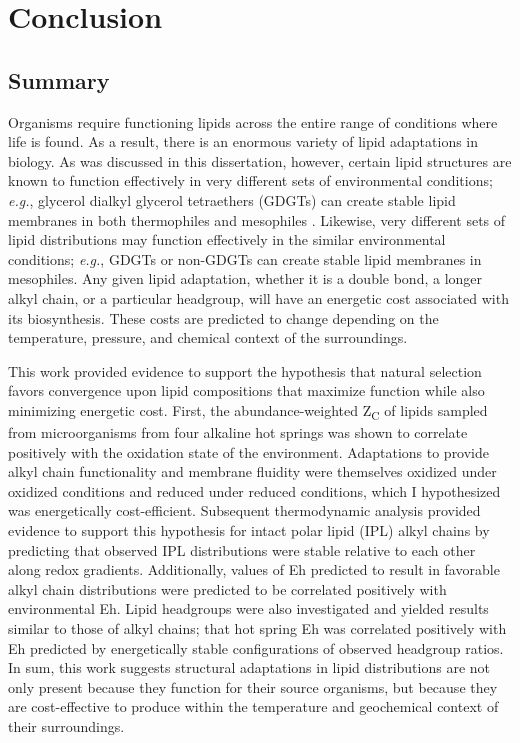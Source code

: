 \chapter[CONCLUSION]{Conclusion}

\section{Summary}

Organisms require functioning lipids across the entire range of conditions where life is found. As a result, there is an enormous variety of lipid adaptations in biology. As was discussed in this dissertation, however, certain lipid structures are known to function effectively in very different sets of environmental conditions; \textit{e.g.}, glycerol dialkyl glycerol tetraethers (GDGTs) can create stable lipid membranes in both thermophiles and mesophiles \citep{schouten2000widespread}. Likewise, very different sets of lipid distributions may function effectively in the similar environmental conditions; \textit{e.g.}, GDGTs or non-GDGTs can create stable lipid membranes in mesophiles. Any given lipid adaptation, whether it is a double bond, a longer alkyl chain, or a particular headgroup, will have an energetic cost associated with its biosynthesis. These costs are predicted to change depending on the temperature, pressure, and chemical context of the surroundings.

This work provided evidence to support the hypothesis that natural selection favors convergence upon lipid compositions that maximize function while also minimizing energetic cost. First, the abundance-weighted Z\textsubscript{C} of lipids sampled from microorganisms from four alkaline hot springs was shown to correlate positively with the oxidation state of the environment. Adaptations to provide alkyl chain functionality and membrane fluidity were themselves oxidized under oxidized conditions and reduced under reduced conditions, which I hypothesized was energetically cost-efficient. Subsequent thermodynamic analysis provided evidence to support this hypothesis for intact polar lipid (IPL) alkyl chains by predicting that observed IPL distributions were stable relative to each other along redox gradients. Additionally, values of Eh predicted to result in favorable alkyl chain distributions were predicted to be correlated positively with environmental Eh. Lipid headgroups were also investigated and yielded results similar to those of alkyl chains; that hot spring Eh was correlated positively with Eh predicted by energetically stable configurations of observed headgroup ratios. In sum, this work suggests structural adaptations in lipid distributions are not only present because they function for their source organisms, but because they are cost-effective to produce within the temperature and geochemical context of their surroundings.

